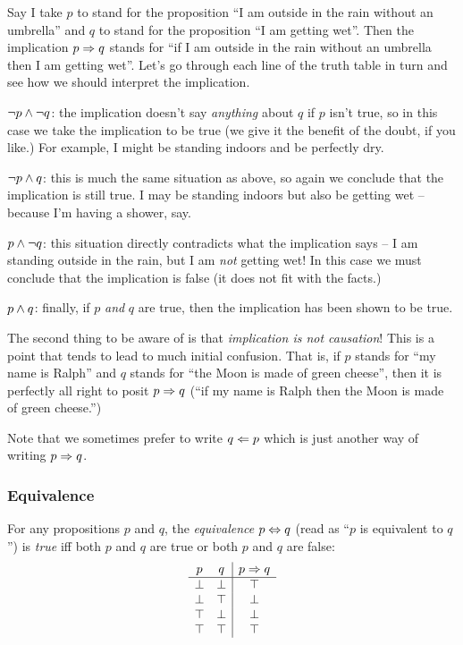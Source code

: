 Say I take $p$ to stand for the proposition ``I am outside in the rain
without an umbrella'' and $q$ to stand for the proposition ``I am
getting wet''.  Then the implication $p \Rightarrow q$ stands for ``if I am
outside in the rain without an umbrella then I am getting wet''.  Let's
go through each line of the truth table in turn and see how we should
interpret the implication.
\begin{description}
\item $\neg{}p \wedge \neg{}q$: the implication doesn't say
\emph{anything} about $q$ if $p$ isn't true, so in this
case we take the implication to be true (we give it the benefit of the
doubt, if you like.)  For example, I might be standing indoors and be
perfectly dry.
\item $\neg{}p \wedge q$: this is much the same situation as above, so
again we conclude that the implication is still true.  I may be standing
indoors but also be getting wet -- because I'm having a shower, say.
\item $p \wedge \neg{}q$: this situation directly contradicts what the
implication says -- I am standing outside in the rain, but I am
\emph{not} getting wet!  In this case we must conclude that the
implication is false (\ie it does not fit with the facts.)
\item $p \wedge q$: finally, if $p$ \emph{and} $q$ are true, then the
implication has been shown to be true.
\end{description}

The second thing to be aware of is that \emph{implication is not
causation}!  This is a point that tends to lead to much initial
confusion.  That is, if $p$ stands for ``my name is Ralph'' and $q$
stands for ``the Moon is made of green cheese'', then it is perfectly
all right to posit $p \Rightarrow q$ (\ie  ``if my name is Ralph then the Moon
is made of green cheese.'')

Note that we sometimes prefer to write $q \Leftarrow p$ which is just another
way of writing $p \Rightarrow q$.

\subsubsection{Equivalence}

For any propositions $p$ and $q$, the \emph{equivalence} $p \Leftrightarrow q$
(read as ``$p$ is equivalent to $q$'') is \emph{true} iff 
both $p$ and $q$ are true or both $p$ and $q$ are false:
\[
\begin{array}{cc|c}
p       & q       & p \Rightarrow q \\
\hline
\perp  & \perp  & \top \\
\perp  & \top   & \perp \\
\top   & \perp  & \perp \\
\top   & \top   & \top \\
\end{array}
\]

